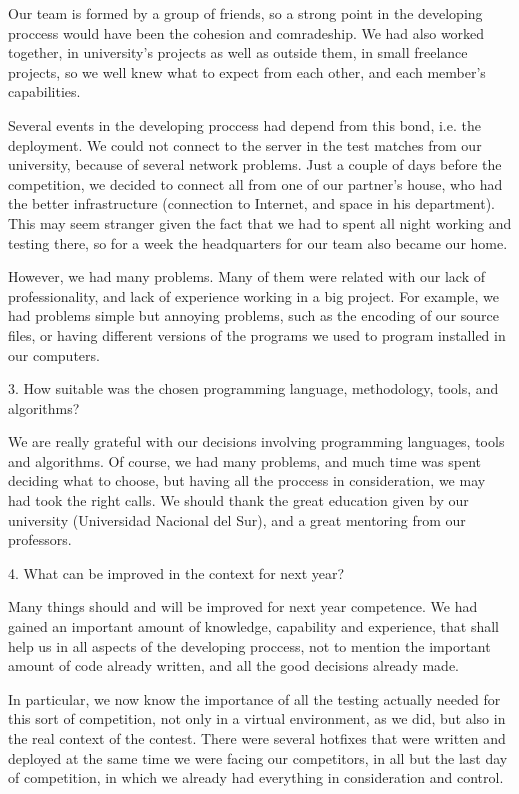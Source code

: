 \documentclass{llncs2e/llncs}
\begin{document}
    Our team is formed by a group of friends, so a strong point in the developing 
    proccess would have been the cohesion and comradeship. We had also worked 
    together, in university's projects as well as outside them, in small freelance 
    projects, so we well knew what to expect from each other, and each member's 
    capabilities. 

    Several events in the developing proccess had depend from this bond, i.e. the 
    deployment. We could not connect to the server in the test matches from our 
    university, because of several network problems. Just a couple of days before 
    the competition, we decided to connect all from one of our partner's house, 
    who had the better infrastructure (connection to Internet, and space in his 
    department). This may seem stranger given the fact that we had to spent all 
    night working and testing there, so for a week the headquarters for our team 
    also became our home.

    However, we had many problems. Many of them were related with our lack of 
    professionality, and lack of experience working in a big project. For example, 
    we had problems simple but annoying problems, such as the encoding of our 
    source files, or having different versions of the programs we used to program
    installed in our computers.

3. How suitable was the chosen programming language, methodology, tools, and 
algorithms?

    We are really grateful with our decisions involving programming languages, 
    tools and algorithms. Of course, we had many problems, and much time was spent 
    deciding what to choose, but having all the proccess in consideration, we may 
    had took the right calls. We should thank the great education given by our 
    university (Universidad Nacional del Sur), and a great mentoring from our 
    professors.

4. What can be improved in the context for next year?

    Many things should and will be improved for next year competence. We had 
    gained an important amount of knowledge, capability and experience, that shall 
    help us in all aspects of the developing proccess, not to mention the 
    important amount of code already written, and all the good decisions already 
    made.

    In particular, we now know the importance of all the testing actually needed 
    for this sort of competition, not only in a virtual environment, as we did, 
    but also in the real context of the contest. There were several hotfixes that 
    were written and deployed at the same time we were facing our competitors, in 
    all but the last day of competition, in which we already had everything in 
    consideration and control.
\end{document}
